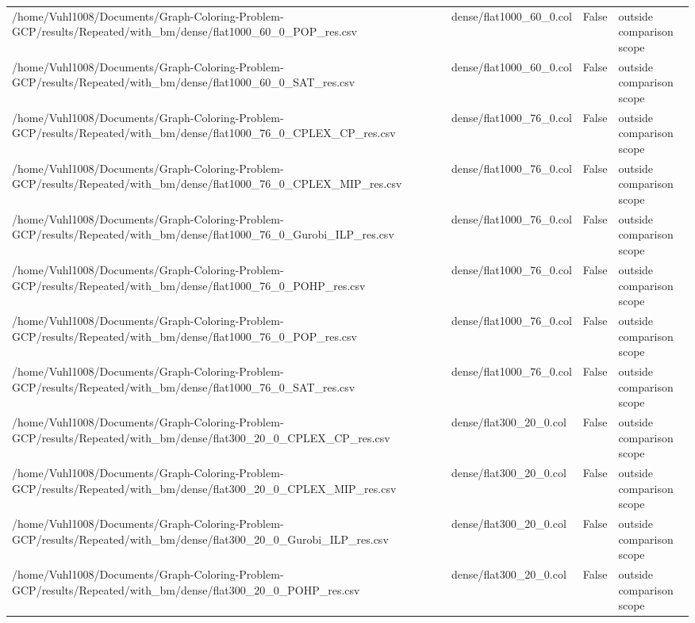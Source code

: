 \begin{table}[htbp]
\begin{tabular}{llll}
/home/Vuhl1008/Documents/Graph-Coloring-Problem-GCP/results/Repeated/with\_bm/dense/flat1000\_60\_0\_POP\_res.csv & dense/flat1000\_60\_0.col & False & outside comparison scope \\
/home/Vuhl1008/Documents/Graph-Coloring-Problem-GCP/results/Repeated/with\_bm/dense/flat1000\_60\_0\_SAT\_res.csv & dense/flat1000\_60\_0.col & False & outside comparison scope \\
/home/Vuhl1008/Documents/Graph-Coloring-Problem-GCP/results/Repeated/with\_bm/dense/flat1000\_76\_0\_CPLEX\_CP\_res.csv & dense/flat1000\_76\_0.col & False & outside comparison scope \\
/home/Vuhl1008/Documents/Graph-Coloring-Problem-GCP/results/Repeated/with\_bm/dense/flat1000\_76\_0\_CPLEX\_MIP\_res.csv & dense/flat1000\_76\_0.col & False & outside comparison scope \\
/home/Vuhl1008/Documents/Graph-Coloring-Problem-GCP/results/Repeated/with\_bm/dense/flat1000\_76\_0\_Gurobi\_ILP\_res.csv & dense/flat1000\_76\_0.col & False & outside comparison scope \\
/home/Vuhl1008/Documents/Graph-Coloring-Problem-GCP/results/Repeated/with\_bm/dense/flat1000\_76\_0\_POHP\_res.csv & dense/flat1000\_76\_0.col & False & outside comparison scope \\
/home/Vuhl1008/Documents/Graph-Coloring-Problem-GCP/results/Repeated/with\_bm/dense/flat1000\_76\_0\_POP\_res.csv & dense/flat1000\_76\_0.col & False & outside comparison scope \\
/home/Vuhl1008/Documents/Graph-Coloring-Problem-GCP/results/Repeated/with\_bm/dense/flat1000\_76\_0\_SAT\_res.csv & dense/flat1000\_76\_0.col & False & outside comparison scope \\
/home/Vuhl1008/Documents/Graph-Coloring-Problem-GCP/results/Repeated/with\_bm/dense/flat300\_20\_0\_CPLEX\_CP\_res.csv & dense/flat300\_20\_0.col & False & outside comparison scope \\
/home/Vuhl1008/Documents/Graph-Coloring-Problem-GCP/results/Repeated/with\_bm/dense/flat300\_20\_0\_CPLEX\_MIP\_res.csv & dense/flat300\_20\_0.col & False & outside comparison scope \\
/home/Vuhl1008/Documents/Graph-Coloring-Problem-GCP/results/Repeated/with\_bm/dense/flat300\_20\_0\_Gurobi\_ILP\_res.csv & dense/flat300\_20\_0.col & False & outside comparison scope \\
/home/Vuhl1008/Documents/Graph-Coloring-Problem-GCP/results/Repeated/with\_bm/dense/flat300\_20\_0\_POHP\_res.csv & dense/flat300\_20\_0.col & False & outside comparison scope \\

\end{tabular}
\end{table}
